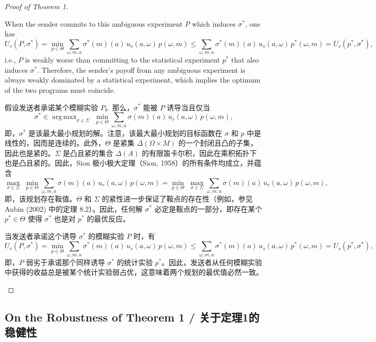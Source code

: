 \documentclass[12pt,a4paper]{article}
\theoremstyle{definition}
\theoremstyle{remark}
\newenvironment{original}{%
    \par\medskip\noindent%
    \begin{tcolorbox}[%
        colback=white,%
        colframe=black!50,%
        title=\textbf{Original English},%
        fonttitle=\small\bfseries,%
        left=0pt, right=0pt, top=2pt, bottom=2pt,%
        boxrule=0.5pt,%
        arc=0pt,%
        outer arc=0pt%
    ]%
    \small%
}{%
    \end{tcolorbox}%
}
\newenvironment{translation}{%
    \par\smallskip\noindent%
    \begin{tcolorbox}[%
        colback=blue!3!white,%
        colframe=blue!40!black,%
        title=\textbf{中文翻译},%
        fonttitle=\small\bfseries,%
        left=0pt, right=0pt, top=2pt, bottom=2pt,%
        boxrule=0.5pt,%
        arc=0pt,%
        outer arc=0pt%
    ]%
    \small\color{blue!60!black}%
}{%
    \end{tcolorbox}\medskip%
}
\DeclareMathOperator{\argmax}{arg\,max}
\begin{document}
\begin{proof}[Proof of Theorem 1]
\begin{original}
When the sender commits to this ambiguous experiment $P$ which induces $\sigma^*$, one has
\[
U_s(P, \sigma^*) = \min_{p \in \Theta} \sum_{\omega, m, a} \sigma^*(m)(a) \, u_s(a, \omega) \, p(\omega, m)
\leq \sum_{\omega, m, a} \sigma^*(m)(a) \, u_s(a, \omega) \, p^*(\omega, m)
= U_s(p^*, \sigma^*),
\]
i.e., $P$ is weakly worse than committing to the statistical experiment $p^*$ that also induces $\sigma^*$. Therefore, the sender's payoff from any ambiguous experiment is always weakly dominated by a statistical experiment, which implies the optimum of the two programs must coincide.
\end{original}
\begin{translation}
假设发送者承诺某个模糊实验 $P$。那么，$\sigma^*$ 能被 $P$ 诱导当且仅当
\[
\sigma^* \in \argmax_{\sigma \in \Sigma} \; \min_{p \in \Theta} \sum_{\omega, m, a} \sigma(m)(a) \, u_r(a, \omega) \, p(\omega, m),
\]
即，$\sigma^*$ 是该最大最小规划的解。注意，该最大最小规划的目标函数在 $\sigma$ 和 $p$ 中是线性的，因而是连续的。此外，$\Theta$ 是紧集 $\Delta(\Omega \times M)$ 的一个封闭且凸的子集，因此也是紧的。$\Sigma$ 是凸且紧的集合 $\Delta(A)$ 的有限笛卡尔积，因此在乘积拓扑下也是凸且紧的。因此，Sion 极小极大定理（Sion, 1958）的所有条件均成立，并蕴含
\[
\max_{\sigma \in \Sigma} \; \min_{p \in \Theta} \sum_{\omega, m, a} \sigma(m)(a) \, u_r(a, \omega) \, p(\omega, m)
= \min_{p \in \Theta} \; \max_{\sigma \in \Sigma} \sum_{\omega, m, a} \sigma(m)(a) \, u_r(a, \omega) \, p(\omega, m),
\]
即，该规划存在鞍值。$\Theta$ 和 $\Sigma$ 的紧性进一步保证了鞍点的存在性（例如，参见 Aubin (2002) 中的定理 8.2）。因此，任何解 $\sigma^*$ 必定是鞍点的一部分，即存在某个 $p^* \in \Theta$ 使得 $\sigma^*$ 也是对 $p^*$ 的最优反应。

当发送者承诺这个诱导 $\sigma^*$ 的模糊实验 $P$ 时，有
\[
U_s(P, \sigma^*) = \min_{p \in \Theta} \sum_{\omega, m, a} \sigma^*(m)(a) \, u_s(a, \omega) \, p(\omega, m)
\leq \sum_{\omega, m, a} \sigma^*(m)(a) \, u_s(a, \omega) \, p^*(\omega, m)
= U_s(p^*, \sigma^*),
\]
即，$P$ 弱劣于承诺那个同样诱导 $\sigma^*$ 的统计实验 $p^*$。因此，发送者从任何模糊实验中获得的收益总是被某个统计实验弱占优，这意味着两个规划的最优值必然一致。
\end{translation}
\end{proof}

\subsection{On the Robustness of Theorem 1 / 关于定理1的稳健性}
\end{document}
